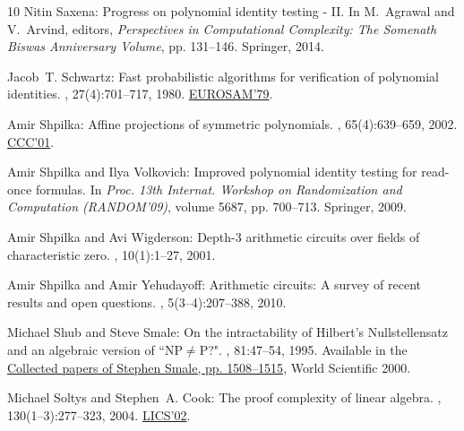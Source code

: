 \documentclass[11pt]{article}
\numberwithin{equation}{section}
\theoremstyle{definition}
\theoremstyle{plain}
\begin{document}
\begin{thebibliography}{10}
{\sc Nitin Saxena}: Progress on polynomial identity testing - {II}.
\newblock In {\sc M.~Agrawal and V.~Arvind}, editors, {\em Perspectives in
  Computational Complexity: The Somenath Biswas Anniversary Volume}, pp.
  131--146. Springer, 2014.

{\sc Jacob~T. Schwartz}: Fast probabilistic algorithms for verification of
  polynomial identities.
, 27(4):701--717, 1980.
\newblock \prelim \href{https://doi.org/10.1007/3-540-09519-5\_72}{EUROSAM'79}.
\newblock [\epfmtdoi{10.1145/322217.322225}]

{\sc Amir Shpilka}: Affine projections of symmetric polynomials.
, 65(4):639--659, 2002.
\newblock \prelim \href{https://doi.org/10.1109/CCC.2001.933883}{CCC'01}.

{\sc Amir Shpilka and Ilya Volkovich}: Improved polynomial identity testing for
  read-once formulas.
\newblock In {\em Proc. 13th Internat. Workshop on Randomization and
  Computation (RANDOM'09)}, volume 5687, pp. 700--713. Springer, 2009.

{\sc Amir Shpilka and Avi Wigderson}: Depth-3 arithmetic circuits over fields
  of characteristic zero.
, 10(1):1--27, 2001.
\newblock [\epfmtdoi{10.1007/PL00001609}]

{\sc Amir Shpilka and Amir Yehudayoff}: Arithmetic circuits: A survey of recent
  results and open questions.
, 5(3--4):207--388, 2010.
\newblock [\epfmtdoi{10.1561/0400000039}]

{\sc Michael Shub and Steve Smale}: On the intractability of {H}ilbert's
  {N}ullstellensatz and an algebraic version of ``{NP$\neq$P}?".
, 81:47--54, 1995.
\newblock Available in the
  \href{https://doi.org/10.1142/9789812792839\_0023}{Collected papers of
  Stephen Smale, pp. 1508--1515}, World Scientific 2000.

{\sc Michael Soltys and Stephen~A. Cook}: The proof complexity of linear
  algebra.
, 130(1--3):277--323, 2004.
\newblock \prelim \href{https://doi.org/10.1109/LICS.2002.1029841}{LICS'02}.


\end{thebibliography}
\end{document}
